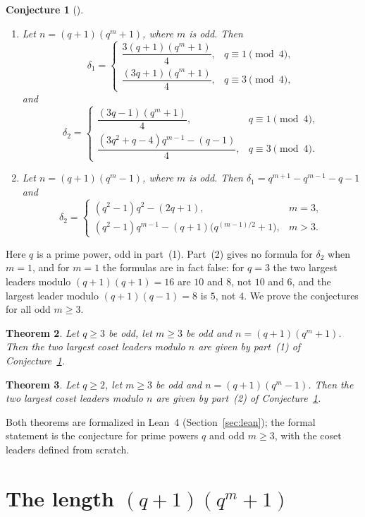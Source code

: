 \documentclass[11pt]{amsart}
\newtheorem{theorem}{Theorem}[section]
\newtheorem{conjecture}[theorem]{Conjecture}
\theoremstyle{remark}
\begin{document}
\begin{conjecture}[{\cite[Sect.~6]{LWZ}}]\label{conj}
\begin{enumerate}
\item Let $n=(q+1)(q^m+1)$, where $m$ is odd. Then
\[
\delta_1=\begin{cases}\dfrac{3(q+1)(q^m+1)}{4},& q\equiv1\pmod 4,\\[2mm] \dfrac{(3q+1)(q^m+1)}{4},& q\equiv3\pmod4,\end{cases}
\]
and
\[
\delta_2=\begin{cases}\dfrac{(3q-1)(q^m+1)}{4},& q\equiv1\pmod 4,\\[2mm] \dfrac{(3q^2+q-4)q^{m-1}-(q-1)}{4},& q\equiv3\pmod4.\end{cases}
\]
\item Let $n=(q+1)(q^m-1)$, where $m$ is odd. Then $\delta_1=q^{m+1}-q^{m-1}-q-1$ and
\[
\delta_2=\begin{cases}(q^2-1)q^2-(2q+1),& m=3,\\ (q^2-1)q^{m-1}-(q+1)\bigl(q^{(m-1)/2}+1\bigr),& m>3.\end{cases}
\]
\end{enumerate}
\end{conjecture}

Here $q$ is a prime power, odd in part~(1).
Part~(2) gives no formula for $\delta_2$ when $m=1$, and for $m=1$ the formulas are in fact false: for $q=3$ the two largest leaders modulo $(q+1)(q+1)=16$ are $10$ and $8$, not $10$ and $6$, and the largest leader modulo $(q+1)(q-1)=8$ is $5$, not $4$.
We prove the conjectures for all odd $m\ge3$.

\begin{theorem}\label{thm:plus}
Let $q\ge3$ be odd, let $m\ge3$ be odd and $n=(q+1)(q^m+1)$.
Then the two largest coset leaders modulo $n$ are given by part~(1) of Conjecture~\ref{conj}.
\end{theorem}

\begin{theorem}\label{thm:minus}
Let $q\ge2$, let $m\ge3$ be odd and $n=(q+1)(q^m-1)$.
Then the two largest coset leaders modulo $n$ are given by part~(2) of Conjecture~\ref{conj}.
\end{theorem}

Both theorems are formalized in Lean~4 (Section~\ref{sec:lean}); the formal statement is the conjecture for prime powers $q$ and odd $m\ge3$, with the coset leaders defined from scratch.

\section{The length $(q+1)(q^m+1)$}\label{sec:plus}
\end{document}
